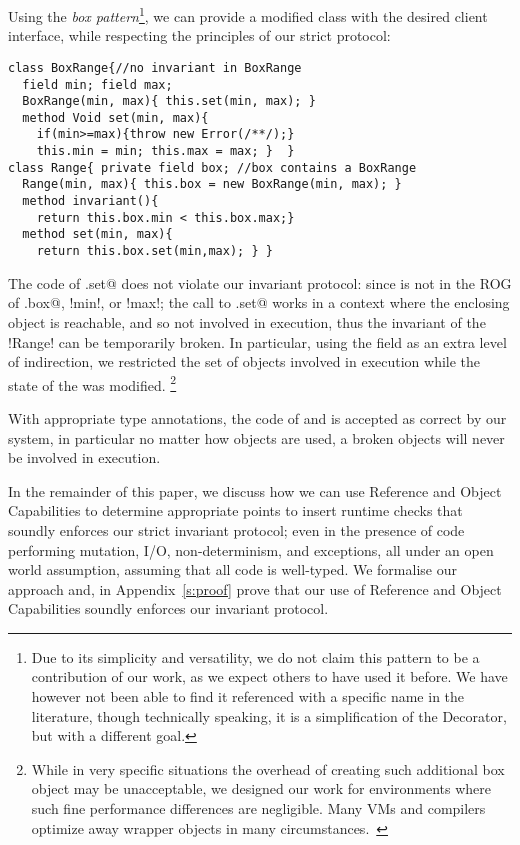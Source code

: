 Using the \emph{box pattern}\footnote{Due to its simplicity and versatility, we do not claim this pattern to be a contribution of our work, as we expect others to have used it before. We have however not been able to find it referenced with a specific name in the literature, though technically speaking, it is a simplification of the Decorator, but with a different goal.}, we can provide a modified
\Q@Range@ class with the desired client interface, while respecting the principles of our strict protocol:
\begin{lstlisting}
class BoxRange{//no invariant in BoxRange
  field min; field max;
  BoxRange(min, max){ this.set(min, max); }
  method Void set(min, max){
    if(min>=max){throw new Error(/**/);}
    this.min = min; this.max = max; }  }
class Range{ private field box; //box contains a BoxRange
  Range(min, max){ this.box = new BoxRange(min, max); }
  method invariant(){
    return this.box.min < this.box.max;}
  method set(min, max){
    return this.box.set(min,max); } }
\end{lstlisting}
The code of \Q@Range.set@ does not violate our invariant protocol: since \Q@this@ is not in the ROG of \Q@this.box@, \Q!min!, or \Q!max!; the call to
\Q@BoxRange.set@ works in a context where the enclosing \Q@Range@ object is
reachable, and so not involved in execution, thus the invariant of the \Q!Range! can be temporarily broken.
In particular, using the \Q@box@ field as an extra level of indirection, we restricted the set of objects involved in execution while the state of the \Q@Range@ was modified.
\footnote{While in very specific situations the overhead of creating such additional box object may be unacceptable, 
we designed our work for environments where such fine performance differences are negligible.
Many VMs and compilers optimize away wrapper objects in many circumstances.~\cite{help}} %

With appropriate type annotations, the code of \Q@Range@ and \Q@BoxRange@ is accepted as correct by our system, in particular no matter how \Q@Range@ objects are used, a broken \Q@Range@ objects will never be involved in execution.

In the remainder of this paper, we discuss how we can use Reference and Object Capabilities to determine appropriate points to insert runtime checks that soundly enforces our strict invariant protocol; even in the presence of code performing mutation, I/O, non-determinism, and exceptions, all under an open world assumption, assuming that all code is well-typed.
We formalise our approach and, in Appendix~\ref{s:proof} prove that our use of Reference and Object Capabilities soundly enforces our invariant protocol.

